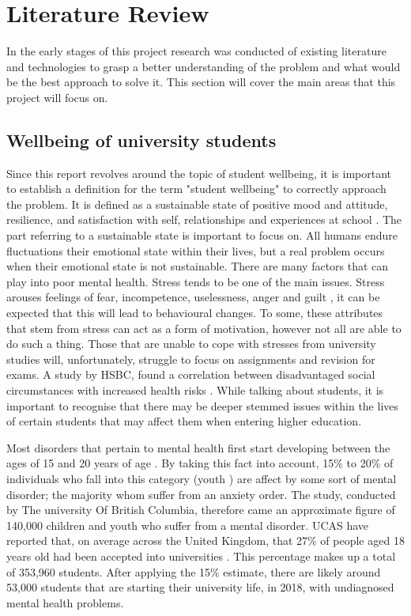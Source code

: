 \section{Literature Review}

In the early stages of this project research was conducted of existing literature and technologies to grasp a better understanding of the problem and what would be the best approach to solve it.
This section will cover the main areas that this project will focus on.

\subsection{Wellbeing of university students}

Since this report revolves around the topic of student wellbeing, it is important to establish a definition for the term "student wellbeing" to correctly approach the problem.
It is defined as a sustainable state of positive mood and attitude, resilience, and satisfaction with self, relationships and experiences at school \cite{noble2008scoping}.
The part referring to a sustainable state is important to focus on. All humans endure fluctuations their emotional state within their lives, but a real problem occurs when their emotional state is not sustainable.
There are many factors that can play into poor mental health. Stress tends to be one of the main issues. 
Stress arouses feelings of fear, incompetence, uselessness, anger and guilt \cite{turunen2014indoor}, it can be expected that this will lead to behavioural changes. 
To some, these attributes that stem from stress can act as a form of motivation, however not all are able to do such a thing.
Those that are unable to cope with stresses from university studies will, unfortunately, struggle to focus on assignments and revision for exams.
A study by HSBC, found a correlation between disadvantaged social circumstances with increased health risks \cite{currie2009social}.
While talking about students, it is important to recognise that there may be deeper stemmed issues within the lives of certain students that may affect them when entering higher education.

Most disorders that pertain to mental health first start developing between the ages of 15 and 20 years of age \cite{kessler2005lifetime}.
By taking this fact into account, 15\% to 20\% of individuals who fall into this category (youth \cite{youth2017definition}) are affect by some sort of mental disorder; the majority whom suffer from an anxiety order. 
The study, conducted by The university Of British Columbia, therefore came an approximate figure of 140,000 children and youth who suffer from a mental disorder. 
UCAS have reported that, on average across the United Kingdom, that 27\% of people aged 18 years old had been accepted into universities \cite{ucas_2018}.
This percentage makes up a total of 353,960 students. 
After applying the 15\% estimate, there are likely around 53,000 students that are starting their university life, in 2018, with undiagnosed mental health problems.

